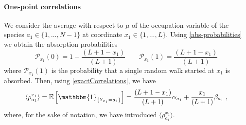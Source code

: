 \documentclass[10pt]{article}
\numberwithin{equation}{section}
\numberwithin{equation}{subsection}
\newcommand{\co}{\;,}
\newcommand{\dt}{\;.}
\begin{document}
\paragraph{One-point correlations}
We consider the average with respect to $\mu$ of the occupation variable of the species $a_{1}\in \{1,\ldots,N-1\}$ at coordinate $x_{1}\in \{1,\ldots,L\}$. %
Using \eqref{abs-probabilities} we obtain the absorption probabilities 
\begin{equation}
	\mathcal{P}_{x_1}(0)=1-\frac{(L+1-x_{1})}{(L+1)}\qquad \mathcal{P}_{x_1}(1)=\frac{(L+1-x_{1})}{(L+1)}
\end{equation} 
where $\mathcal{P}_{x_1}(1)$ is the probability that a single random walk started at $x_1$ is absorbed. Then, using \eqref{exactCorrelations}, we have
\begin{equation}\label{one-pts-corr}
		\langle\rho_{a_{1}}^{x_{1}}\rangle= \mathbb{E}\left[\mathbbm{1}_{\{Y_{x_{1}}=a_{1}\}}\right]=\frac{(L+1-x_{1})}{(L+1)}\alpha_{a_{1}}+\frac{x_{1}}{(L+1)}\beta_{a_{1}}\co
\end{equation} 
{where, for the sake of notation, we have introduced $\langle\rho_{a_{1}}^{x_{1}}\rangle$.}
\end{document}
